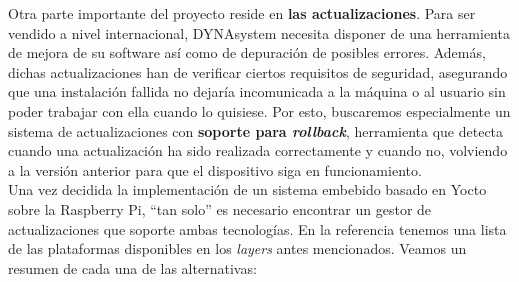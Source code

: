 Otra parte importante del proyecto reside en \textbf{las actualizaciones}. Para ser vendido a nivel internacional, DYNAsystem necesita disponer de una herramienta de mejora de su software así como de depuración de posibles errores. Además, dichas actualizaciones han de verificar ciertos requisitos de seguridad, asegurando que una instalación fallida no dejaría incomunicada a la máquina o al usuario sin poder trabajar con ella cuando lo quisiese. Por esto, buscaremos especialmente un sistema de actualizaciones con \textbf{soporte para \textit{rollback}}, herramienta que detecta cuando una actualización ha sido realizada correctamente y cuando no, volviendo a la versión anterior para que el dispositivo siga en funcionamiento.\\

Una vez decidida la implementación de un sistema embebido basado en Yocto sobre la Raspberry Pi, ``tan solo'' es necesario encontrar un gestor de actualizaciones que soporte ambas tecnologías. En la referencia \cite{yocto-system-update} tenemos una lista de las plataformas disponibles en los \textit{layers} antes mencionados. Veamos un resumen de cada una de las alternativas:

